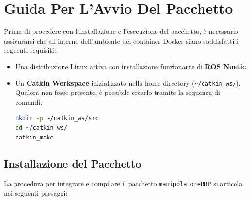 \documentclass[11pt, a4paper]{report}
\begin{document}
\section{Guida Per L'Avvio Del Pacchetto}
\label{sec:guida_avvio}

Prima di procedere con l'installazione e l'esecuzione del pacchetto, è necessario assicurarsi che all'interno dell'ambiente del container Docker siano soddisfatti i seguenti requisiti:
\begin{itemize}
    \item Una distribuzione Linux attiva con installazione funzionante di \textbf{ROS Noetic}.
    \item Un \textbf{Catkin Workspace} inizializzato nella home directory (\texttt{\textasciitilde/catkin\_ws/}). Qualora non fosse presente, è possibile crearlo tramite la sequenza di comandi:
    \begin{lstlisting}[language=bash]
mkdir -p ~/catkin_ws/src
cd ~/catkin_ws/
catkin_make
    \end{lstlisting}
\end{itemize}

\subsection{Installazione del Pacchetto}
La procedura per integrare e compilare il pacchetto \texttt{manipolatoreRRP} si articola nei seguenti passaggi:
\end{document}
